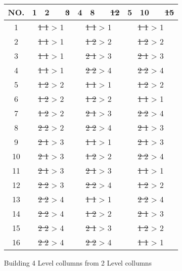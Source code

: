 \begin{figure}[!h]
	\centering
	\begin{tabular}{ |c||cccc|cccc|cccc|  }
		\hline
		NO.& 1 & 2 & & \sout{3} & 4 & 8 & &  \sout{12} & 5 & 10 & &  \sout{15}\\
		\hline
		1  & \multicolumn{4}{c}{\sout{1 1} > 1 } & \multicolumn{4}{|c|}{\sout{1 1} > 1 } & \multicolumn{4}{c|}{\sout{1 1} > 1 }\\
		2  & \multicolumn{4}{c}{\sout{1 1} > 1 } & \multicolumn{4}{|c|}{\sout{1 2} > 2 } & \multicolumn{4}{c|}{\sout{1 2} > 2 }\\
		3  & \multicolumn{4}{c}{\sout{1 1} > 1 } & \multicolumn{4}{|c|}{\sout{2 1} > 3 } & \multicolumn{4}{c|}{\sout{2 1} > 3 }\\
		4  & \multicolumn{4}{c}{\sout{1 1} > 1 } & \multicolumn{4}{|c|}{\sout{2 2} > 4 } & \multicolumn{4}{c|}{\sout{2 2} > 4 }\\
		5  & \multicolumn{4}{c}{\sout{1 2} > 2 } & \multicolumn{4}{|c|}{\sout{1 1} > 1 } & \multicolumn{4}{c|}{\sout{1 2} > 2 }\\
		6  & \multicolumn{4}{c}{\sout{1 2} > 2 } & \multicolumn{4}{|c|}{\sout{1 2} > 2 } & \multicolumn{4}{c|}{\sout{1 1} > 1 }\\
		7  & \multicolumn{4}{c}{\sout{1 2} > 2 } & \multicolumn{4}{|c|}{\sout{2 1} > 3 } & \multicolumn{4}{c|}{\sout{2 2} > 4 }\\
		8  & \multicolumn{4}{c}{\sout{2 2} > 2 } & \multicolumn{4}{|c|}{\sout{2 2} > 4 } & \multicolumn{4}{c|}{\sout{2 1} > 3 }\\
		9  & \multicolumn{4}{c}{\sout{2 1} > 3 } & \multicolumn{4}{|c|}{\sout{1 1} > 1 } & \multicolumn{4}{c|}{\sout{2 1} > 3 }\\
		10 & \multicolumn{4}{c}{\sout{2 1} > 3 } & \multicolumn{4}{|c|}{\sout{1 2} > 2 } & \multicolumn{4}{c|}{\sout{2 2} > 4 }\\
		11 & \multicolumn{4}{c}{\sout{2 1} > 3 } & \multicolumn{4}{|c|}{\sout{2 1} > 3 } & \multicolumn{4}{c|}{\sout{1 1} > 1 }\\
		12 & \multicolumn{4}{c}{\sout{2 2} > 3 } & \multicolumn{4}{|c|}{\sout{2 2} > 4 } & \multicolumn{4}{c|}{\sout{1 2} > 2 }\\
		13 & \multicolumn{4}{c}{\sout{2 2} > 4 } & \multicolumn{4}{|c|}{\sout{1 1} > 1 } & \multicolumn{4}{c|}{\sout{2 2} > 4 }\\
		14 & \multicolumn{4}{c}{\sout{2 2} > 4 } & \multicolumn{4}{|c|}{\sout{1 2} > 2 } & \multicolumn{4}{c|}{\sout{2 1} > 3 }\\
		15 & \multicolumn{4}{c}{\sout{2 2} > 4 } & \multicolumn{4}{|c|}{\sout{2 1} > 3 } & \multicolumn{4}{c|}{\sout{1 2} > 2 }\\
		16 & \multicolumn{4}{c}{\sout{2 2} > 4 } & \multicolumn{4}{|c|}{\sout{2 2} > 4 } & \multicolumn{4}{c|}{\sout{1 1} > 1 }\\
		\hline
	\end{tabular}
	\caption{Building 4 Level collumns from 2 Level collumns}
\end{figure}

